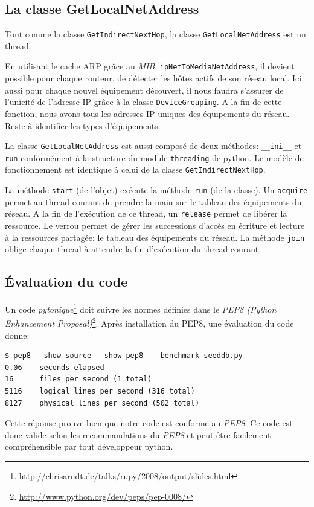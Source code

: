 \subsection{La classe GetLocalNetAddress}
Tout comme la classe \texttt{GetIndirectNextHop}, la classe \texttt{GetLocalNetAddress} est un thread.


En utilisant le cache ARP grâce au \emph{MIB}, \texttt{ipNetToMediaNetAddress}, il devient possible pour chaque routeur, de détecter les hôtes actifs de son réseau local. Ici aussi pour chaque nouvel équipement découvert, il nous faudra s'assurer de l'unicité de l'adresse IP grâce à la classe \texttt{DeviceGrouping}. A la fin de cette fonction, nous avons tous les adresses IP uniques des équipements du réseau. Reste à identifier les types d'équipements.

La classe \texttt{GetLocalNetAddress} est aussi composé de deux méthodes: \texttt{\_\_ini\_\_} et \texttt{run} conformément à la structure du module \texttt{threading} de python. Le modèle de fonctionnement est identique à celui de la classe \texttt{GetIndirectNextHop}. 

La méthode \texttt{start} (de l'objet) exécute la méthode \texttt{run} (de la classe). Un \texttt{acquire} permet au thread courant de prendre la main sur le tableau des équipements du réseau. A la fin de l'exécution de ce thread, un \texttt{release} permet de libérer la ressource. Le verrou permet de gérer les successions d'accès en écriture et lecture à la ressources partagée: le tableau des équipements du réseau. La méthode \texttt{join} oblige chaque thread à attendre la fin d'exécution du thread courant. 



\subsection{Évaluation du code}
Un code \emph{pytonique}\footnote{\url{http://chrisarndt.de/talks/rupy/2008/output/slides.html}} doit suivre les normes définies dans  le \emph{PEP8 (Python Enhancement Proposal)}\footnote{\url{http://www.python.org/dev/peps/pep-0008/}}. Après installation du PEP8, une évaluation du code donne:
\begin{lstlisting}[frame=single] 
$ pep8 --show-source --show-pep8  --benchmark seeddb.py 
0.06    seconds elapsed
16      files per second (1 total)
5116    logical lines per second (316 total)
8127    physical lines per second (502 total)
\end{lstlisting}
Cette réponse prouve bien que notre code est conforme au \emph{PEP8}. Ce code est donc valide selon les recommandations du \emph{PEP8} et peut être facilement compréhensible par tout développeur python.
 

